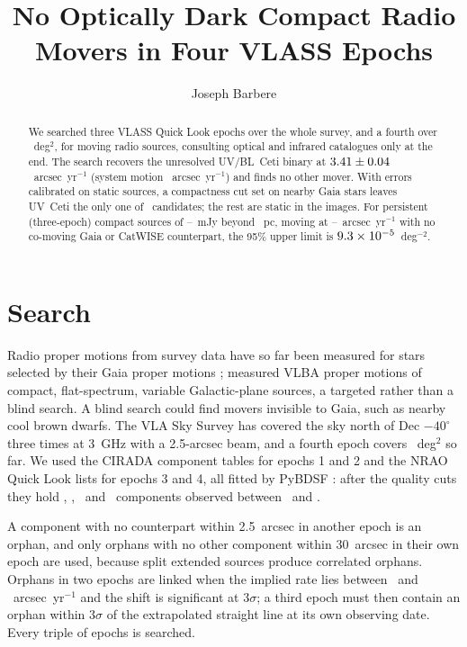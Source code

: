 \documentclass[twocolumn]{aastex631}
\begin{document}
\title{No Optically Dark Compact Radio Movers in Four VLASS Epochs}
\author[0009-0008-3289-4447]{Joseph Barbere}

\begin{abstract}
We searched three VLASS Quick Look epochs over the whole survey, and a fourth over
\vpmRealAreaFour~deg$^2$, for moving radio sources, consulting optical and infrared catalogues only
at the end. The search recovers the unresolved UV/BL~Ceti binary at
$3.41\pm0.04$~arcsec~yr$^{-1}$ (system motion \vpmRealSysMu~arcsec~yr$^{-1}$)
and finds no other mover. With errors calibrated on static sources, a compactness cut set
on nearby Gaia stars leaves UV~Ceti the only one of \vpmRealNCandBefore\ candidates; the rest are
static in the images. For persistent (three-epoch) compact sources of
\vpmRealFluxLoThree--\vpmRealFluxHiThree~mJy beyond \vpmRealPlxDomain~pc, moving at
\vpmRealRateDomLo--\vpmRealRateMax~arcsec~yr$^{-1}$ with no co-moving Gaia or CatWISE counterpart,
the 95\% upper limit is $9.3\times10^{-5}$~deg$^{-2}$.
\end{abstract}


\section{Search}
\label{sec:search}
Radio proper motions from survey data have so far been measured for stars selected by their Gaia
proper motions \citep{driessen2023,de2024}; \citet{atri2022} measured VLBA proper motions of
compact, flat-spectrum, variable Galactic-plane sources, a targeted rather than a blind search. A
blind search could find movers invisible to Gaia, such as nearby cool brown dwarfs. The VLA Sky
Survey \citep[VLASS;][]{lacy2020} has covered the sky north of Dec $-40^\circ$ three times at
3~GHz with a 2.5-arcsec beam, and a fourth epoch covers \vpmRealAreaFour~deg$^2$ so far. We used
the CIRADA component tables for epochs 1 and 2 \citep{gordon2021} and the NRAO Quick Look lists
for epochs 3 and 4, all fitted by PyBDSF \citep{pybdsf}: after the quality cuts they hold
\vpmRealNEOne, \vpmRealNETwo, \vpmRealNEThree\ and \vpmRealNEFour\ components observed between
\vpmRealTStart\ and \vpmRealTEnd.

A component with no counterpart within 2.5~arcsec in another epoch is an orphan, and only
orphans with no other component within 30~arcsec in their own epoch are used, because split
extended sources produce correlated orphans. Orphans in two epochs are linked when the implied
rate lies between \vpmRealRateMin\ and \vpmRealRateMax~arcsec~yr$^{-1}$ and the shift is
significant at $3\sigma$; a third epoch must then contain an orphan within $3\sigma$ of the
extrapolated straight line at its own observing date. Every triple of epochs is searched.
\end{document}

